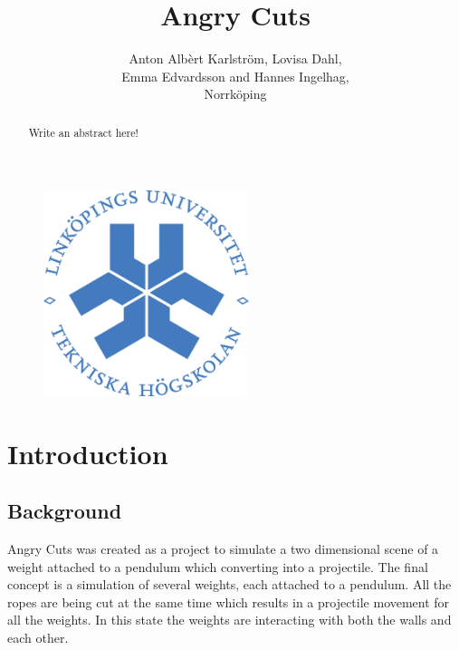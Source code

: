 \documentclass[a4paper,12pt,twoside,english]{article}
\title{Angry Cuts}
\author{Anton Alb\`{e}rt Karlstr\"{o}m, Lovisa Dahl, \\Emma Edvardsson
 and Hannes Ingelhag, \\Norrk\"{o}ping}
\begin{document}


\begin{figure}
\begin{center}
\includegraphics[width=6cm]{bilder/LiTH_sigill_col.png} 
\end{center}
\end{figure}

\maketitle
{}

\newpage
\begin{abstract}
Write an abstract here!
\vfill
\end{abstract}


\newpage

\pagestyle{plain}


\setcounter{page}{1}
\section{Introduction}
\subsection{Background}
Angry Cuts was created as a project to simulate a two dimensional scene of a weight attached to a pendulum which converting into a projectile. 
The final concept is a simulation of several weights, each attached to a pendulum. All the ropes are being cut at the same time which results in a projectile movement for all the weights. In this state the weights are interacting with both the walls and each other.
\end{document}

